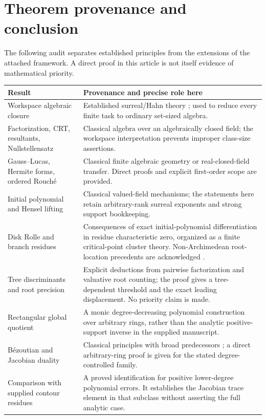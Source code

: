 \documentclass[11pt,letterpaper,oneside]{article}
\numberwithin{equation}{section}
\theoremstyle{definition}
\theoremstyle{remark}\newtheorem{remark}[theorem]{Remark}
\begin{document}
\section{Theorem provenance and conclusion}\label{sec:provenance}
The following audit separates established principles from the extensions
of the attached framework. A direct proof in this article is not itself
evidence of mathematical priority.

\begin{longtable}{@{}L{0.26\textwidth}L{0.64\textwidth}@{}}
\toprule
Result & Provenance and precise role here\\
\midrule
\endhead
Workspace algebraic closure & Established surreal/Hahn theory
\cite{Conway,Gonshor,vdDE,Poonen}; used to reduce every finite task to
ordinary set-sized algebra.\\[0.45em]
Factorization, CRT, resultants, Nullstellensatz & Classical algebra over
an algebraically closed field; the workspace interpretation prevents
improper class-size assertions.\\[0.45em]
Gauss--Lucas, Hermite forms, ordered Rouch\'e & Classical finite algebraic
geometry or real-closed-field transfer. Direct proofs and explicit
first-order scope are provided.\\[0.45em]
Initial polynomial and Hensel lifting & Classical valued-field mechanisms;
the statements here retain arbitrary-rank surreal exponents and strong
support bookkeeping.\\[0.45em]
Disk Rolle and branch residues & Consequences of exact initial-polynomial
differentiation in residue characteristic zero, organized as a finite
critical-point cluster theory. Non-Archimedean root-location precedents
are acknowledged \cite{ChoiLee}.\\[0.45em]
Tree discriminants and root precision & Explicit deductions from pairwise
factorization and valuative root counting; the proof gives a tree-dependent
threshold and the exact leading displacement. No priority claim is made.\\[0.45em]
Rectangular global quotient & A monic degree-decreasing polynomial
construction over arbitrary rings, rather than the analytic positive-support
inverse in the supplied manuscript.\\[0.45em]
B\'ezoutian and Jacobian duality & Classical principles with broad
predecessors \cite{BCRS,BMP}; a direct arbitrary-ring proof is given for
the stated degree-controlled family.\\[0.45em]
Comparison with supplied contour residues & A proved identification for
positive lower-degree polynomial errors. It establishes the Jacobian
trace element in that subclass without asserting the full analytic case.\\
\bottomrule
\end{longtable}
\end{document}
